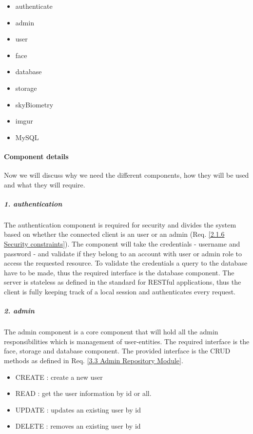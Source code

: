 \documentclass[a4paper,11pt]{article}
\begin{document}
\begin{itemize}
\item
  authenticate
\item
  admin
\item
  user
\item
  face
\item
  database
\item
  storage
\item
  skyBiometry
\item
  imgur
\item
  MySQL
\end{itemize}

\paragraph{Component details}\label{component-details}

Now we will discuss why we need the different components, how they will
be used and what they will require.

\subparagraph{1. authentication}\label{authentication}

The authentication component is required for security and divides the
system based on whether the connected client is an user or an admin (Req. \ref{2.1.6 Security constraints}). The component will take the credentials - username and password - and validate if they belong to an account with user or admin role to access the requested resource. To validate the credentials a query to the database have to be made, thus the required interface is the database component. The server is stateless as defined in the standard for RESTful applications, thus the client is fully keeping track of a local session and authenticates every request.

\subparagraph{2. admin}\label{admin}

The admin component is a core component that will hold all the admin
responsibilities which is management of user-entities. The
required interface is the face, storage and database component. The
provided interface is the CRUD methods as defined in Req. \ref{3.3 Admin Repository Module}.

\begin{itemize}
\item
  CREATE : create a new user
\item
  READ : get the user information by id or all.
\item
  UPDATE : updates an existing user by id
\item
  DELETE : removes an existing user by id
\end{itemize}
\end{document}
